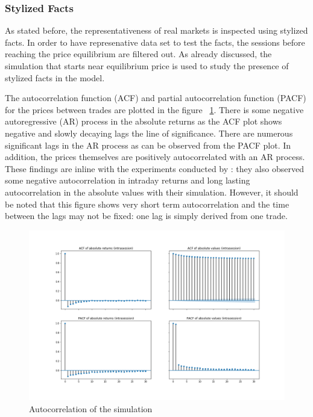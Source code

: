 \subsubsection{Stylized Facts}
As stated before, the representativeness of real markets is inspected using
stylized facts. In order to have represenative data set to test the facts, the
sessions before reaching the price equilibrium are filtered out. 
As already discussed, the simulation that starts near equilibrium price
is used to study the presence of stylized facts in the model. 

The autocorrelation function (ACF) and partial autocorrelation function (PACF) for the prices between
trades are plotted in the figure ~\ref{fig:basic_autocorr}. There is some negative autoregressive
(AR) process in the absolute returns as the ACF plot shows negative and slowly decaying lags 
the line of significance. There are numerous significant lags in the AR process as can be observed from 
the PACF plot. In addition, the prices themselves are positively autocorrelated with an AR process.
These findings are inline with the experiments conducted by \citet{Raberto05}: they also observed
some negative autocorrelation in intraday returns and long lasting autocorrelation in the absolute
values with their simulation. However, it should be noted that this figure shows very short term
autocorrelation and the time between the lags may not be fixed: one lag is simply derived from one
trade. 


\begin{figure}
    \includegraphics[width=\linewidth]{plots/basic_autocorrelation_intra.png}
    \caption{Autocorrelation of the simulation}
    \label{fig:basic_autocorr}
\end{figure}

